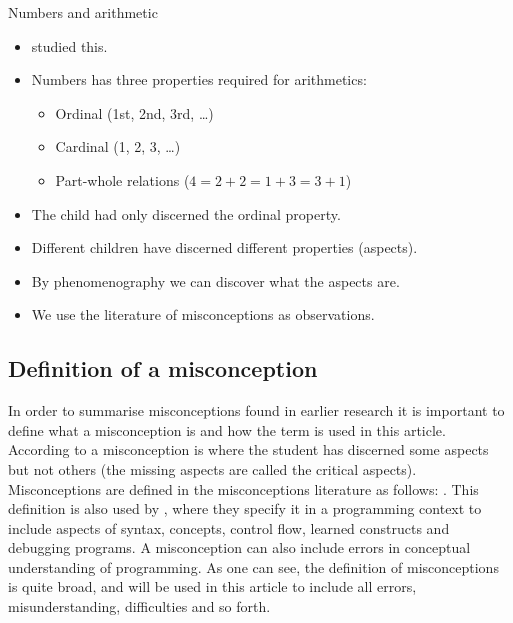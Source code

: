 \begin{frame}[fragile]
  \begin{block}{Numbers and arithmetic~\parencite{Neuman1987}}
    \begin{itemize}
      \item \Textcite{Neuman1987} studied this.
      \item Numbers has three properties required for arithmetics:
        \begin{itemize}
          \item \alert<2-3>{Ordinal (1st, 2nd, 3rd, \dots)}
          \item \alert<3>{Cardinal (1, 2, 3, \dots)}
          \item \alert<3>{Part-whole relations (\(4 = 2 + 2 = 1 + 3 = 3 + 1\))}
        \end{itemize}
        \pause
      \item The child had only discerned the ordinal property.
    \end{itemize}
  \end{block}

  \pause

  \begin{remark}
    \begin{itemize}
      \item Different children have discerned different properties (aspects).
      \item By phenomenography we can discover what the aspects are.

        \pause

      \item \alert<4>{We use the literature of misconceptions as observations.}
    \end{itemize}
  \end{remark}
\end{frame}

\subsection<article>{Definition of a misconception}

In order to summarise misconceptions found in earlier research it is 
important to define what a misconception is and how the term is used in this 
article. According to \textcite{NCOL} a misconception is where the student has 
discerned some aspects but not others (the missing aspects are called the 
critical aspects).
Misconceptions are defined in the misconceptions literature as follows: 
. This definition is also used by 
\textcite{MisconceptionsSurvey2017}, where they specify it in a programming 
context to include aspects of syntax, concepts, control flow, learned 
constructs and debugging programs. A misconception can also include errors in 
conceptual understanding of programming. As one can see, the definition of 
misconceptions is quite broad, and will be used in this article to include all 
errors, misunderstanding, difficulties and so forth.

